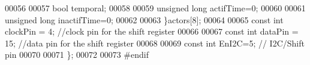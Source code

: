 \begin{DoxyCode}
00056 
00057     \textcolor{keywordtype}{bool} temporal;
00058     
00059     \textcolor{keywordtype}{unsigned} \textcolor{keywordtype}{long} actifTime=0;
00060     
00061     \textcolor{keywordtype}{unsigned} \textcolor{keywordtype}{long} inactifTime=0;    
00062 
00063     \}actors[8];
00064 
00065     \textcolor{keyword}{const} \textcolor{keywordtype}{int} clockPin = 4; \textcolor{comment}{//clock pin for the shift register}
00066     
00067     \textcolor{keyword}{const} \textcolor{keywordtype}{int} dataPin = 15; \textcolor{comment}{//data  pin for the shift register}
00068 
00069     \textcolor{keyword}{const} \textcolor{keywordtype}{int} EnI2C=5;  \textcolor{comment}{// I2C/Shift pin}
00070     
00071 \};
00072 
00073 \textcolor{preprocessor}{#endif}
\end{DoxyCode}
